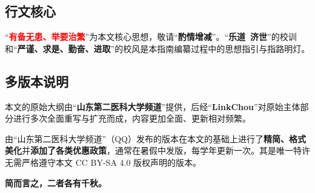 \subsection[行文核心]{行文核心}
“\textcolor{red}{\textbf{有备无患、举要治繁}}”为本文核心思想，敬请“\textbf{酌情增减}”。“\textbf{乐道\ 济世}”的校训和“\textbf{严谨、求是、勤奋、进取}”的校风是本指南编纂过程中的思想指引与指路明灯。

\subsection[多版本说明]{多版本说明}
本文的原始大纲由“\textbf{山东第二医科大学频道}”提供，后经“\textbf{LinkChou}”对原始主体部分进行多次全面重写与扩充而成，内容更加全面、更新相对频繁。

由“山东第二医科大学频道”（QQ）发布的版本在本文的基础上进行了\textbf{精简、格式美化}并\textbf{添加了各类优惠政策}，通常在暑假中发版，每学年更新一次。其是唯一特许无需严格遵守本文 CC BY-SA 4.0 版权声明的版本。

\textbf{简而言之，二者各有千秋。}
